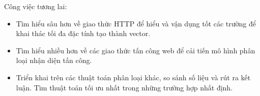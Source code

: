 \documentclass[../main-report.tex]{subfiles}
\begin{document}
Công việc tương lai:

\begin{itemize}
\item Tìm hiểu sâu hơn về giao thức HTTP để hiểu và vận dụng tốt các trường để khai thác tối đa đặc tính tạo thành vector.
\item Tìm hiểu nhiều hơn về các giao thức tấn công web để cải tiến mô hình phân loại nhận diện tấn công.
\item Triển khai trên các thuật toán phân loại khác, so sánh số liệu và rút ra kết luận. Tìm thuật toán tối ưu nhất trong những trường hợp nhất định.
\end{itemize}
\end{document}
